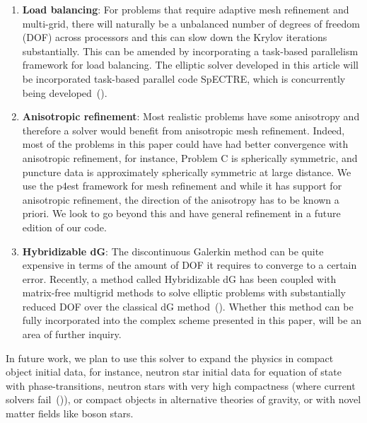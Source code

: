 \begin{enumerate}
\item {\bf Load balancing}: For problems that require adaptive mesh
  refinement and multi-grid, there will naturally be a unbalanced
  number of degrees of freedom (DOF) across processors and this can
  slow down the Krylov iterations substantially. This can be amended
  by incorporating a task-based parallelism framework for load
  balancing.  The elliptic solver developed in this article will be incorporated  task-based parallel code SpECTRE, which is concurrently being developed~(\citet*{kidder:16}).
\item {\bf Anisotropic refinement}: Most realistic problems have some
  anisotropy and therefore a solver would benefit from anisotropic
  mesh refinement.  Indeed, most of the problems in this paper could
  have had better convergence with anisotropic refinement, for instance, Problem C is spherically symmetric, and puncture data is approximately spherically symmetric at large distance.  We use the
  p4est framework for mesh refinement and while it has support for
  anisotropic refinement, the direction of the anisotropy has to be
  known a priori. We look to go beyond this and have general
  refinement in a future edition of our code.
\item {\bf Hybridizable dG}: The discontinuous Galerkin method can be quite
  expensive in terms of the amount of DOF it requires to converge to a
  certain error. Recently, a method called Hybridizable dG has been
  coupled with matrix-free multigrid methods to solve elliptic
  problems with substantially reduced DOF over the classical dG
  method~(\citet*{fabien2019manycore,muralikrishnan2019multilevel}). Whether
  this method can be fully incorporated into the complex scheme
  presented in this paper, will be an area of further inquiry.
\end{enumerate}

In future work, we plan to use this solver to expand the physics in
compact object initial data, for instance, neutron star initial data
for equation of state with phase-transitions, neutron stars with
very high compactness (where current solvers fail~(\citet*{henriksson:2014tba})),
or compact objects in alternative theories of gravity, or with novel matter fields like boson stars.


